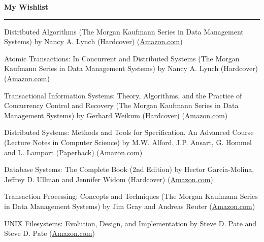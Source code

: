 \documentclass[10pt]{article}
\newcommand{\makeheading}[1]%
        {\hspace*{-\marginparsep minus \marginparwidth}%
         \begin{minipage}[t]{\textwidth+\marginparwidth+\marginparsep}%
                {\large \bfseries #1}\\[-0.15\baselineskip]%
                 \rule{\columnwidth}{1pt}%
         \end{minipage}}
\renewcommand{\section}[2]%
        {\pagebreak[2]\vspace{1.3\baselineskip}%
         \phantomsection\addcontentsline{toc}{section}{#1}%
         \hspace{0in}%
         \marginpar{
         \raggedright \scshape #1}#2}
\newenvironment{innerlist}[1][\enskip\textbullet]%
        {\begin{compactitem}[#1]}{\end{compactitem}}
\begin{document}
\makeheading {My Wishlist}

\section {Books}
	\begin{innerlist}
                \item Distributed Algorithms (The Morgan Kaufmann Series in Data Management Systems)
                  by Nancy A. Lynch (Hardcover)
                  (\href{http://www.amazon.com/Distributed-Algorithms-Kaufmann-Management-Systems/dp/1558603484}{Amazon.com})
                \item Atomic Transactions: In Concurrent and Distributed Systems (The Morgan Kaufmann Series in Data Management Systems)
                  by Nancy A. Lynch (Hardcover)
                  (\href{http://www.amazon.com/Atomic-Transactions-Concurrent-Distributed-Management/dp/155860104X}{Amazon.com})
                \item Transactional Information Systems: Theory, Algorithms, and the Practice of Concurrency Control and Recovery (The Morgan Kaufmann Series in Data Management Systems)
                  by Gerhard Weikum (Hardcover)
                  (\href{http://www.amazon.com/Transactional-Information-Systems-Algorithms-Concurrency/dp/1558605088}{Amazon.com})
                \item Distributed Systems: Methods and Tools for Specification. An Advanced Course (Lecture Notes in Computer Science)
                  by M.W. Alford, J.P. Ansart, G. Hommel and L. Lamport  (Paperback)
                  (\href{http://www.amazon.com/Distributed-Systems-Specification-Advanced-Computer/dp/3540152164}{Amazon.com})
                \item Database Systems: The Complete Book (2nd Edition)
                  by Hector Garcia-Molina, Jeffrey D. Ullman and Jennifer Widom  (Hardcover)
                  (\href{http://www.amazon.com/Database-Systems-Complete-Book-2nd/dp/0131873253}{Amazon.com})
                \item Transaction Processing: Concepts and Techniques (The Morgan Kaufmann Series in Data Management Systems)
                  by Jim Gray and Andreas Reuter
                  (\href{http://www.amazon.com/Transaction-Processing-Concepts-Techniques-Management/dp/1558601902}{Amazon.com})
                \item UNIX Filesystems: Evolution, Design, and Implementation
                  by Steve D. Pate and Steve D. Pate
                  (\href{http://www.amazon.com/UNIX-Filesystems-Evolution-Design-Implementation/dp/0471164836}{Amazon.com})

\end{innerlist}
\end{document}
